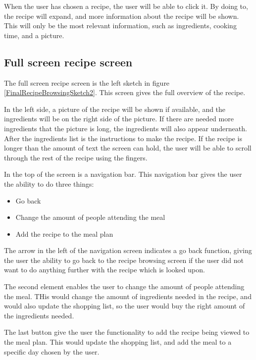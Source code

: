 When the user has chosen a recipe, the user will be able to click it. By doing to, the recipe will expand, and more information about the recipe will be shown. This will only be the most relevant information, such as ingredients, cooking time, and a picture.

\subsection{Full screen recipe screen}

The full screen recipe screen is the left sketch in figure \ref{FinalRecipeBrowsingSketch2}. This screen gives the full overview of the recipe.

In the left side, a picture of the recipe will be shown if available, and the ingredients will be on the right side of the picture. If there are needed more ingredients that the picture is long, the ingredients will also appear underneath. After the ingredients list is the instructions to make the recipe. If the recipe is longer than the amount of text the screen can hold, the user will be able to scroll through the rest of the recipe using the fingers.

In the top of the screen is a navigation bar. This navigation bar gives the user the ability to do three things:

\begin{itemize}
    \item Go back
    \item Change the amount of people attending the meal
    \item Add the recipe to the meal plan
\end{itemize}

The arrow in the left of the navigation screen indicates a go back function, giving the user the ability to go back to the recipe browsing screen if the user did not want to do anything further with the recipe which is looked upon.

The second element enables the user to change the amount of people attending the meal. THis would change the amount of ingredients needed in the recipe, and would also update the shopping list, so the user would buy the right amount of the ingredients needed.

The last button give the user the functionality to add the recipe being viewed to the meal plan. This would update the shopping list, and add the meal to a specific day chosen by the user.